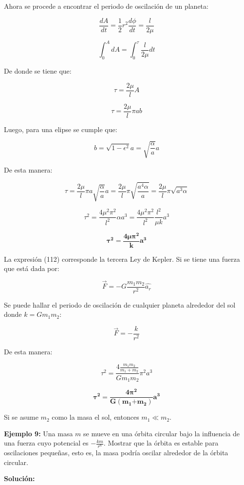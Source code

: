 \documentclass[]{article}
\begin{document}
Ahora se procede a encontrar el periodo de oscilación de un planeta:

\[\frac{dA}{dt} = \frac{1}{2}r^{2}\frac{d\phi}{dt} = \frac{l}{2\mu}\]

\[\int_{0}^{A}{dA = \int_{0}^{\tau}{\frac{l}{2\mu}dt}}\]

De donde se tiene que:

\[\tau = \frac{2\mu}{l}A\]

\[\tau = \frac{2\mu}{l}\pi ab\]

Luego, para una elipse se cumple que:

\[b = \sqrt{1 - \epsilon^{2}}a = \sqrt{\frac{\alpha}{a}}a\]

De esta manera:

\[\tau = \frac{2\mu}{l}\pi a\sqrt{\frac{\alpha}{a}}a = \frac{2\mu}{l}\pi\sqrt{\frac{a^{4}\alpha}{a}} = \frac{2\mu}{l}\pi\sqrt{a^{3}\alpha}\]

\[\tau^{2} = \frac{4\mu^{2}\pi^{2}}{l^{2}}\alpha a^{3} = \frac{4\mu^{2}\pi^{2}}{l^{2}}\frac{l^{2}}{\mu k}a^{3}\]

\[\mathbf{\tau}^{\mathbf{2}}\mathbf{=}\frac{\mathbf{4}\mathbf{\mu}\mathbf{\pi}^{\mathbf{2}}}{\mathbf{k}}\mathbf{a}^{\mathbf{3}}\]

La expresión (112) corresponde la tercera Ley de Kepler. Si se tiene una
fuerza que está dada por:

\[\overrightarrow{F} = - G\frac{m_{1}m_{2}}{r^{2}}\widehat{a_{r}}\]

Se puede hallar el periodo de oscilación de cualquier planeta alrededor
del sol donde \(k = Gm_{1}m_{2}\):

\[\overrightarrow{F} = - \frac{k}{r^{2}}\]

De esta manera:

\[\tau^{2} = \frac{4\frac{m_{1}m_{2}}{m_{1} + m_{2}}}{Gm_{1}m_{2}}\pi^{2}a^{3}\]

\[\mathbf{\tau}^{\mathbf{2}}\mathbf{=}\frac{\mathbf{4}\mathbf{\pi}^{\mathbf{2}}}{\mathbf{G}\left( \mathbf{m}_{\mathbf{1}}\mathbf{+}\mathbf{m}_{\mathbf{2}} \right)}\mathbf{a}^{\mathbf{3}}\]

Si se asume \(m_{2}\) como la masa el sol, entonces \(m_{1} \ll m_{2}.\)

\textbf{Ejemplo 9:} Una masa \(m\) se mueve en una órbita circular bajo
la influencia de una fuerza cuyo potencial es \(- \frac{km}{r^{n}}\).
Mostrar que la órbita es estable para oscilaciones pequeñas, esto es, la
masa podría oscilar alrededor de la órbita circular.

\textbf{Solución:}
\end{document}
